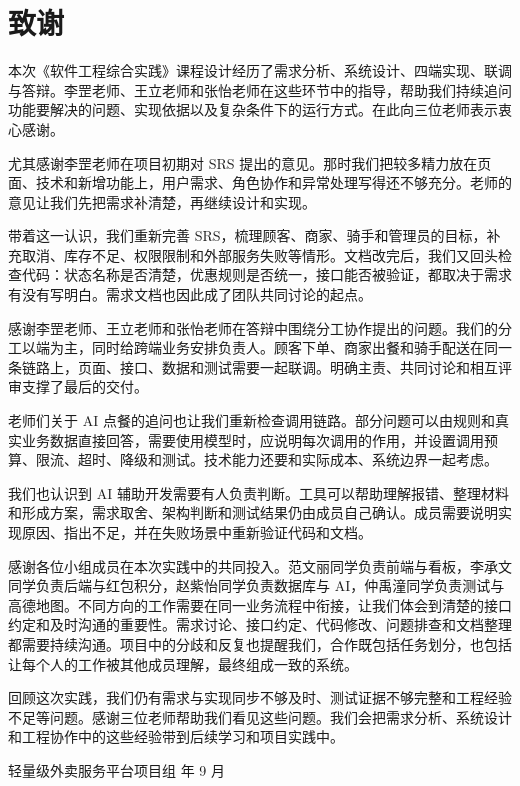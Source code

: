 \chapter*{致谢}
本次《软件工程综合实践》课程设计经历了需求分析、系统设计、四端实现、联调与答辩。李罡老师、王立老师和张怡老师在这些环节中的指导，帮助我们持续追问功能要解决的问题、实现依据以及复杂条件下的运行方式。在此向三位老师表示衷心感谢。

尤其感谢李罡老师在项目初期对 SRS 提出的意见。那时我们把较多精力放在页面、技术和新增功能上，用户需求、角色协作和异常处理写得还不够充分。老师的意见让我们先把需求补清楚，再继续设计和实现。

带着这一认识，我们重新完善 SRS，梳理顾客、商家、骑手和管理员的目标，补充取消、库存不足、权限限制和外部服务失败等情形。文档改完后，我们又回头检查代码：状态名称是否清楚，优惠规则是否统一，接口能否被验证，都取决于需求有没有写明白。需求文档也因此成了团队共同讨论的起点。

感谢李罡老师、王立老师和张怡老师在答辩中围绕分工协作提出的问题。我们的分工以端为主，同时给跨端业务安排负责人。顾客下单、商家出餐和骑手配送在同一条链路上，页面、接口、数据和测试需要一起联调。明确主责、共同讨论和相互评审支撑了最后的交付。

老师们关于 AI 点餐的追问也让我们重新检查调用链路。部分问题可以由规则和真实业务数据直接回答，需要使用模型时，应说明每次调用的作用，并设置调用预算、限流、超时、降级和测试。技术能力还要和实际成本、系统边界一起考虑。

我们也认识到 AI 辅助开发需要有人负责判断。工具可以帮助理解报错、整理材料和形成方案，需求取舍、架构判断和测试结果仍由成员自己确认。成员需要说明实现原因、指出不足，并在失败场景中重新验证代码和文档。

感谢各位小组成员在本次实践中的共同投入。范文丽同学负责前端与看板，李承文同学负责后端与红包积分，赵紫怡同学负责数据库与 AI，仲禹潼同学负责测试与高德地图。不同方向的工作需要在同一业务流程中衔接，让我们体会到清楚的接口约定和及时沟通的重要性。需求讨论、接口约定、代码修改、问题排查和文档整理都需要持续沟通。项目中的分歧和反复也提醒我们，合作既包括任务划分，也包括让每个人的工作被其他成员理解，最终组成一致的系统。

回顾这次实践，我们仍有需求与实现同步不够及时、测试证据不够完整和工程经验不足等问题。感谢三位老师帮助我们看见这些问题。我们会把需求分析、系统设计和工程协作中的这些经验带到后续学习和项目实践中。

\vspace{0.5em}\begin{flushright}轻量级外卖服务平台项目组 年 9 月\end{flushright}
